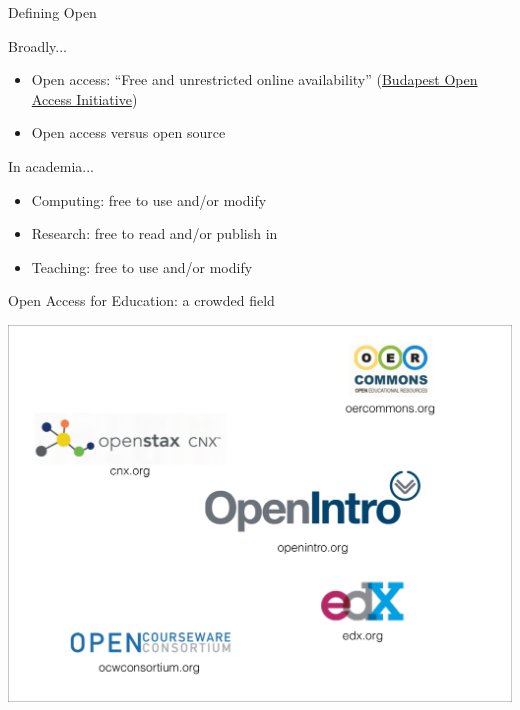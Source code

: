 
\begin{frame}{Defining Open}

\begin{block}{Broadly...}
\begin{itemize}
        \item Open access: ``Free and unrestricted online availability'' (\href{http://www.budapestopenaccessinitiative.org/read}{Budapest Open Access Initiative})
        \item Open access versus open source
\end{itemize}
\end{block}

\begin{block}{In academia...}
\begin{itemize}
        \item Computing: free to use and/or modify
        \item Research: free to read and/or publish in
        \item Teaching: free to use and/or modify
\end{itemize}
\end{block}

\end{frame}


\begin{frame}{Open Access for Education: a crowded field}

\includegraphics[width=\linewidth]{openEdLogos}

\end{frame}

